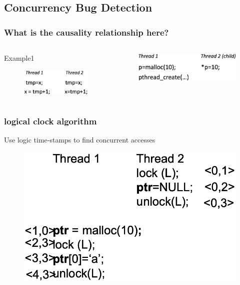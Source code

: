 \subsection{Concurrency Bug Detection} %
\begin{frame}[fragile]
    \frametitle{What is the causality relationship here?}
    \begin{columns}
    \begin{column}{0.5\textwidth}
        Example1

        \begin{figure}
        \includegraphics[width=0.4\linewidth]{figs/data-race-example-1.png}
        \end{figure}
        
	\end{column}
    \begin{column}{0.5\textwidth}
    \begin{figure}
    \includegraphics[width=0.4\linewidth]{figs/data-race-example-2.png}
    \end{figure}

\end{column}
	\end{columns}
\end{frame}
% 
% 
% 
% 
% 
% 
\begin{frame}[fragile]
    \frametitle{logical clock algorithm}

Use logic time‐stamps to find concurrent accesses

    \begin{figure}
    \includegraphics[width=0.4\linewidth]{figs/Happen‐before.png}
    \end{figure}
\end{frame}

